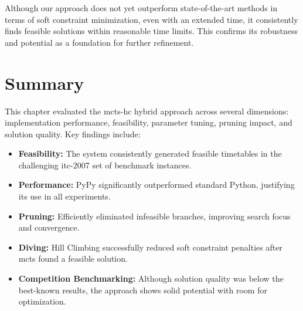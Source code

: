 Although our approach does not yet outperform state-of-the-art methods in terms of soft constraint minimization, even with an extended time, it consistently finds feasible solutions within reasonable time limits. This confirms its robustness and potential as a foundation for further refinement.

\section{Summary}

This chapter evaluated the \ac{mcts}-\ac{hc} hybrid approach across several dimensions: implementation performance, feasibility, parameter tuning, pruning impact, and solution quality. Key findings include:

\begin{itemize}
\item \textbf{Feasibility:} The system consistently generated feasible timetables in the challenging \ac{itc-2007} set of benchmark instances.

\item \textbf{Performance:} PyPy significantly outperformed standard Python, justifying its use in all experiments.

\item \textbf{Pruning:} Efficiently eliminated infeasible branches, improving search focus and convergence.

\item \textbf{Diving:} Hill Climbing successfully reduced soft constraint penalties after \ac{mcts} found a feasible solution.

\item \textbf{Competition Benchmarking:} Although solution quality was below the best-known results, the approach shows solid potential with room for optimization.
\end{itemize}